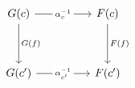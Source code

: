 \documentclass[a4paper]{article}
\begin{document}
\[\begin{tikzcd}
	{G(c)} && {F(c)} \\
	\\
	{G(c')} && {F(c')}
	\arrow["{G(f)}", from=1-1, to=3-1]
	\arrow["{F(f)}", from=1-3, to=3-3]
	\arrow["{\alpha_c^{-1}}"{description}, from=1-1, to=1-3]
	\arrow["{\alpha_{c'}^{-1}}"{description}, from=3-1, to=3-3]
\end{tikzcd}\]
\end{document}
